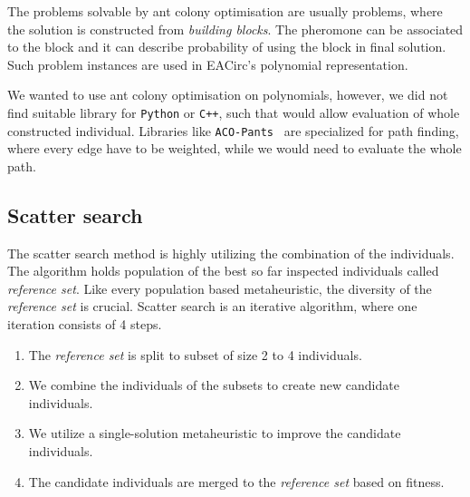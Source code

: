\documentclass[
  print, %
  Table,   %
  nolof,     %
  nolot,     %
  11pt, %
  oneside  %
]{fithesis3}
\begin{document}
The problems solvable by ant colony optimisation are usually problems, where the solution is constructed from \textit{building blocks}. The pheromone can be associated to the block and it can describe probability of using the block in final solution. Such problem instances are used in EACirc's polynomial representation.

We wanted to use ant colony optimisation on polynomials, however, we did not find suitable library for \texttt{Python} or \texttt{C++}, such that would allow evaluation of whole constructed individual. Libraries like \texttt{ACO-Pants}~\cite{acoPants} are specialized for path finding, where every edge have to be weighted, while we would need to evaluate the whole path.

\subsection{Scatter search}
\label{subsec:opt-multi-sol-scatter}

The scatter search method is highly utilizing the combination of the individuals. The algorithm holds population of the best so far inspected individuals called \textit{reference set}. Like every population based metaheuristic, the diversity of the \textit{reference set} is crucial. Scatter search is an iterative algorithm, where one iteration consists of 4 steps.

\begin{enumerate}
    \item The \textit{reference set} is split to subset of size 2 to 4 individuals.
    \item We combine the individuals of the subsets to create new candidate individuals.
    \item We utilize a single-solution metaheuristic to improve the candidate individuals.
    \item The candidate individuals are merged to the \textit{reference set} based on fitness.
\end{enumerate}
\end{document}
